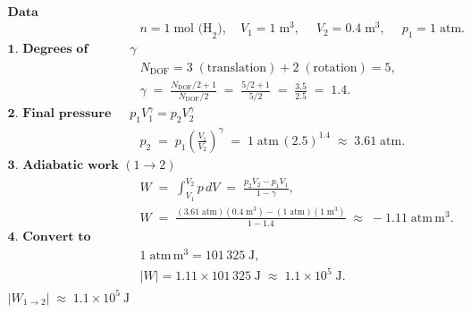 \documentclass[12pt]{article}
\theoremstyle{definition} %
\theoremstyle{plain} %
\begin{document}
  \begin{align}
    \textbf{Data}\\[2pt]
    &n = 1\;\text{mol (H}_2\text{)}, 
    \quad V_1 = 1\;\text{m}^3,\;
    \quad V_2 = 0.4\;\text{m}^3,\;
    \quad p_1 = 1\;\text{atm}.\\[8pt]
    \textbf{1.\ Degrees of freedom and } \gamma \\[2pt]
    &N_{\text{DOF}} = 3\;(\text{translation}) + 2\;(\text{rotation}) = 5,\\[4pt]
    &\displaystyle 
    \gamma \;=\; \frac{N_{\text{DOF}}/2 + 1}{N_{\text{DOF}}/2}
              \;=\; \frac{5/2 + 1}{5/2}
              \;=\; \frac{3.5}{2.5}
              \;=\; 1.4.\\[10pt]
    \textbf{2.\ Final pressure from } p_1V_1^{\gamma}=p_2V_2^{\gamma}\\[4pt]
    &\displaystyle 
    p_2 \;=\; p_1\!\left(\frac{V_1}{V_2}\right)^{\gamma}
            \;=\; 1\;\text{atm}\,(2.5)^{1.4}
            \;\approx\; 3.61\;\text{atm}.\\[10pt]
    \textbf{3.\ Adiabatic work }(1\!\to\!2)\\[2pt]
    &\displaystyle 
    W \;=\; \int_{V_1}^{V_2} p\,dV
          \;=\; \frac{p_2V_2 - p_1V_1}{1-\gamma},\\[4pt]
    &\displaystyle 
    W \;=\; \frac{(3.61\;\text{atm})(0.4\;\text{m}^3) - (1\;\text{atm})(1\;\text{m}^3)}
                  {1 - 1.4}
         \;\approx\; -1.11\;\text{atm}\,\text{m}^3.\\[10pt]
    \textbf{4.\ Convert to joules}\\[2pt]
    &1\;\text{atm}\,\text{m}^3 = 101\,325\;\text{J},\\[4pt]
    &|W| = 1.11 \times 101\,325\;\text{J}
          \;\approx\; 1.1\times 10^{5}\;\text{J}.\\[8pt]
    \boxed{|W_{1\to 2}| \;\approx\; 1.1\times 10^{5}\ \text{J}}
    \end{align}
\end{document}
